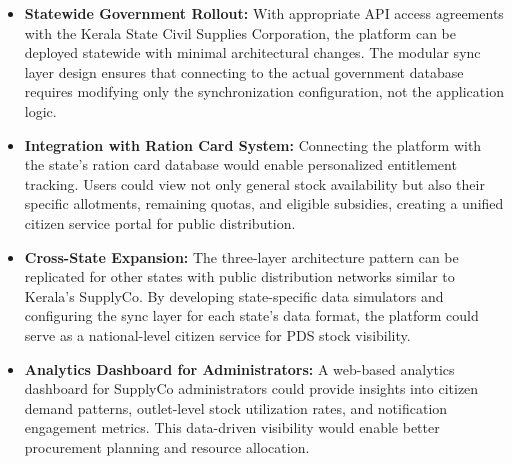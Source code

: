 \begin{itemize}
    \item \textbf{Statewide Government Rollout:} With appropriate API access agreements with the Kerala State Civil Supplies Corporation, the platform can be deployed statewide with minimal architectural changes. The modular sync layer design ensures that connecting to the actual government database requires modifying only the synchronization configuration, not the application logic.

    \item \textbf{Integration with Ration Card System:} Connecting the platform with the state's ration card database would enable personalized entitlement tracking. Users could view not only general stock availability but also their specific allotments, remaining quotas, and eligible subsidies, creating a unified citizen service portal for public distribution.

    \item \textbf{Cross-State Expansion:} The three-layer architecture pattern can be replicated for other states with public distribution networks similar to Kerala's SupplyCo. By developing state-specific data simulators and configuring the sync layer for each state's data format, the platform could serve as a national-level citizen service for PDS stock visibility.

    \item \textbf{Analytics Dashboard for Administrators:} A web-based analytics dashboard for SupplyCo administrators could provide insights into citizen demand patterns, outlet-level stock utilization rates, and notification engagement metrics. This data-driven visibility would enable better procurement planning and resource allocation.
\end{itemize}

